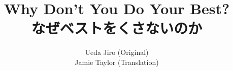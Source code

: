 \documentclass[paper=a4,fontsize=11pt]{report}	 	%
\begin{document}
\begin{CJK}{UTF8}{min}								%


\renewcommand\rubysep{-0.1ex}

\title{Why Don't You Do Your Best?\\なぜベストをくさないのか}
\author{Ueda Jiro (Original)\\Jamie Taylor (Translation)}
\maketitle




\end{CJK}
\end{document}
